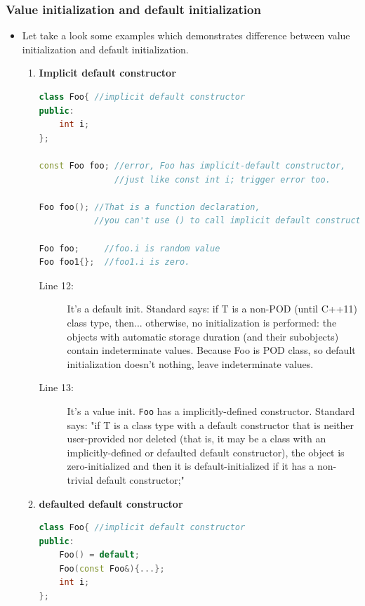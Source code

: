 \documentclass[a4paper,11pt,twoside]{book}
\begin{document}
\subsubsection{Value initialization and default initialization}
\begin{itemize}
 
	\item Let take a look some examples which demonstrates difference between value initialization and default initialization.
	\begin{enumerate}
		\item \textbf{Implicit default constructor}
\begin{lstlisting}[frame=single, language=c++]
class Foo{ //implicit default constructor
public:
	int i;
};

const Foo foo; //error, Foo has implicit-default constructor, 
               //just like const int i; trigger error too.
				
Foo foo(); //That is a function declaration, 
           //you can't use () to call implicit default constructor.

Foo foo;     //foo.i is random value
Foo foo1{};	 //foo1.i is zero.		 
\end{lstlisting}

\begin{description}			
\item[Line 12:]	 It's a default init. Standard says: if T is a non-POD (until C++11) class type, then... otherwise, no initialization is performed: the objects with automatic storage duration (and their subobjects) contain indeterminate values.
Because Foo is POD class, so default initialization doesn't nothing, leave indeterminate values.

\item[Line 13:]  It's a value init. \texttt{Foo} has a implicitly-defined constructor. Standard says: "if T is a class type with a default constructor that is neither user-provided nor deleted (that is, it may be a class with an implicitly-defined or defaulted default constructor), the object is zero-initialized and then it is default-initialized if it has a non-trivial default constructor;"
\end{description}

		\item \textbf{defaulted default constructor}
\begin{lstlisting}[frame=single, language=c++]
class Foo{ //implicit default constructor
public:
	Foo() = default;
	Foo(const Foo&){...};
	int i;
};
	

\end{lstlisting}
\end{enumerate}
\end{itemize}
\end{document}
